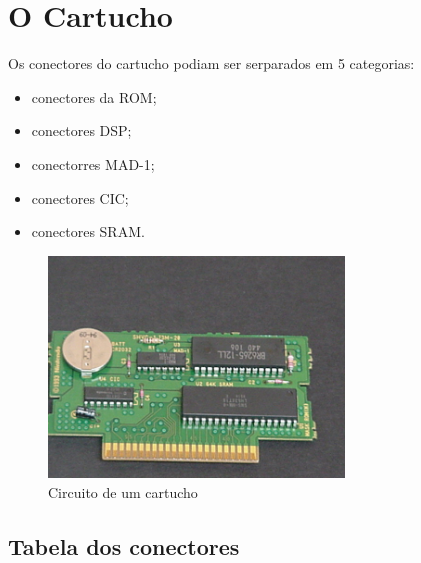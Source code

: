\documentclass[paper=a4, fontsize=11pt]{scrartcl}	%
\numberwithin{equation}{section}															%
\numberwithin{figure}{section}																%
\numberwithin{table}{section}																%
\begin{document}
\section{O Cartucho}
Os conectores do cartucho podiam ser serparados em 5 categorias:\\
\begin{itemize}
\item conectores da ROM;
\item conectores DSP;
\item conectorres MAD-1;
\item conectores CIC;
\item conectores SRAM.
\end{itemize}
\begin{figure}[h!]
	\centering
    \includegraphics[width=0.7\textwidth]{img/cart0}
    \caption{Circuito de um cartucho}
\end{figure}
\subsection*{Tabela dos conectores}
\end{document}
